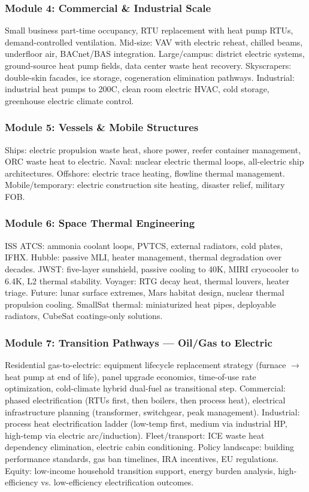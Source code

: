 \documentclass[11pt,letterpaper]{article}
\begin{document}
\subsubsection{Module 4: Commercial \& Industrial Scale}
Small business part-time occupancy, RTU replacement with heat pump RTUs, demand-controlled ventilation. Mid-size: VAV with electric reheat, chilled beams, underfloor air, BACnet/BAS integration. Large/campus: district electric systems, ground-source heat pump fields, data center waste heat recovery. Skyscrapers: double-skin facades, ice storage, cogeneration elimination pathways. Industrial: industrial heat pumps to 200\textdegree C, clean room electric HVAC, cold storage, greenhouse electric climate control.

\subsubsection{Module 5: Vessels \& Mobile Structures}
Ships: electric propulsion waste heat, shore power, reefer container management, ORC waste heat to electric. Naval: nuclear electric thermal loops, all-electric ship architectures. Offshore: electric trace heating, flowline thermal management. Mobile/temporary: electric construction site heating, disaster relief, military FOB.

\subsubsection{Module 6: Space Thermal Engineering}
ISS ATCS: ammonia coolant loops, PVTCS, external radiators, cold plates, IFHX. Hubble: passive MLI, heater management, thermal degradation over decades. JWST: five-layer sunshield, passive cooling to 40K, MIRI cryocooler to 6.4K, L2 thermal stability. Voyager: RTG decay heat, thermal louvers, heater triage. Future: lunar surface extremes, Mars habitat design, nuclear thermal propulsion cooling. SmallSat thermal: miniaturized heat pipes, deployable radiators, CubeSat coatings-only solutions.

\subsubsection{Module 7: Transition Pathways --- Oil/Gas to Electric}
Residential gas-to-electric: equipment lifecycle replacement strategy (furnace $\rightarrow$ heat pump at end of life), panel upgrade economics, time-of-use rate optimization, cold-climate hybrid dual-fuel as transitional step. Commercial: phased electrification (RTUs first, then boilers, then process heat), electrical infrastructure planning (transformer, switchgear, peak management). Industrial: process heat electrification ladder (low-temp first, medium via industrial HP, high-temp via electric arc/induction). Fleet/transport: ICE waste heat dependency elimination, electric cabin conditioning. Policy landscape: building performance standards, gas ban timelines, IRA incentives, EU regulations. Equity: low-income household transition support, energy burden analysis, high-efficiency vs. low-efficiency electrification outcomes.
\end{document}

